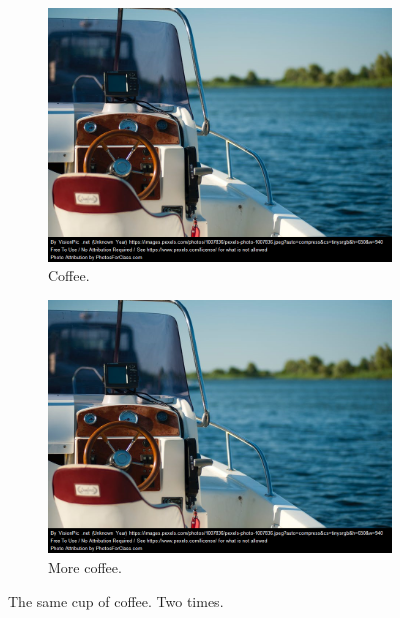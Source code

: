 \documentclass{article}
\begin{document}
	\begin{figure}[h!]
		\centering
		\begin{subfigure}[b]{0.4\linewidth}
			\includegraphics[width=\linewidth]{boat.png}
			\caption{Coffee.}
		\end{subfigure}
		\begin{subfigure}[b]{0.4\linewidth}
			\includegraphics[width=\linewidth]{boat.png}
			\caption{More coffee.}
		\end{subfigure}
		\caption{The same cup of coffee. Two times.}
		\label{fig:coffee}
	\end{figure}
	
\end{document}
